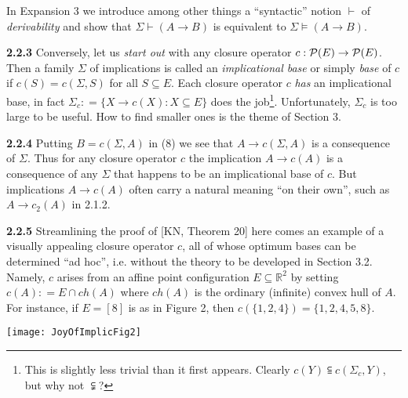 \documentclass[11pt]{article}
\newcommand{\R}{\mathbb{R}}
\newcommand{\ra}{\rightarrow}
\begin{document}
In Expansion 3 we introduce among other things a ``syntactic'' notion $\vdash$ of {\it derivability} and show that $\Sigma \vdash (A \ra B)$ is equivalent to $\Sigma \vDash (A \ra  B)$.


{\bf 2.2.3}  Conversely, let  us {\it start out} with any closure operator $c: {\cal P}(E) \ra {\cal P}(E)$. Then a family $\Sigma$ of implications is called an {\it implicational base} or simply {\it base} of $c$ if $c(S) = c(\Sigma, S)$ for all $S \subseteq E$. Each closure operator $c$ {\it has} an implicational base, in fact $\Sigma_c : = \{X \ra c(X) : X \subseteq E\}$ does the job\footnote{This is slightly less trivial than it first appears.  Clearly $c(Y) \subseteqq c(\Sigma_c, Y)$, but why not $\subsetneqq$?}. Unfortunately, $\Sigma_c$ is too large to be useful. How to find smaller ones is the theme of Section 3.  





{\bf 2.2.4} Putting $B = c(\Sigma, A)$ in (8) we see that $A \ra c(\Sigma, A)$ is a consequence of $\Sigma$. 
Thus for any closure operator $c$ the implication $A \ra c(A)$ is a consequence of any $\Sigma$ that happens to be an implicational base of $c$. But implications $A \ra c(A)$ often carry a natural meaning ``on their own'', such as $A \ra c_2(A)$ in 2.1.2.


{\bf 2.2.5} Streamlining the proof of [KN, Theorem 20] here comes an example of a visually appealing closure operator $c$, all of whose optimum bases can be determined ``ad hoc'', i.e. without the theory to be developed in Section 3.2. Namely, $c$ arises from an affine point configuration $E \subseteq \R^2$ by setting $c(A) : = E\cap ch(A)$ where $ch(A)$ is the ordinary (infinite) convex hull of $A$. For instance, if $E = [8]$ is as in Figure 2, then $c(\{1,2,4\}) = \{1, 2, 4, 5, 8\}$.


\begin{center}
\texttt{[image: JoyOfImplicFig2]}
\end{center}
\end{document}
